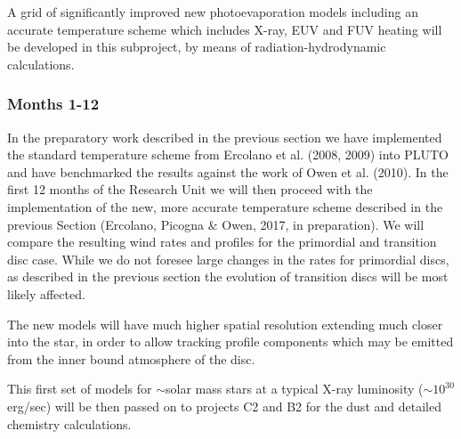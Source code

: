 \documentclass[10pt,fleqn,twoside]{article}
\makeatletter
\renewcommand\paragraph{\@startsection{paragraph}{4}{\z@}%
            {-2.5ex\@plus -1ex \@minus -.25ex}%
            {1.25ex \@plus .25ex}%
            {\normalfont\normalsize\bfseries}}
\makeatother
\begin{document}
A grid of significantly improved new photoevaporation models including
an accurate temperature scheme which includes X-ray, EUV and FUV
heating will be developed in this subproject, by means of
radiation-hydrodynamic calculations. 






\subsubsection{Months 1-12}
In the preparatory work described in the previous section we have
implemented the standard temperature scheme from Ercolano et
al. (2008, 2009) into PLUTO and have benchmarked the results against
the work of Owen et al. (2010). In the first 12 months of the Research
Unit we will then proceed with the implementation of the new, more accurate
temperature scheme described in the previous Section (Ercolano,
Picogna \& Owen, 2017, in preparation). We will compare the resulting
wind rates and profiles for the primordial and transition disc
case. While we do not foresee large changes in the rates for
primordial discs, as described in the previous section the evolution of transition discs will be most
likely affected. 

The new models will have much higher spatial
resolution extending much closer into the star, in order to allow
tracking profile components which may be emitted from the inner bound
atmosphere of the disc. 

This first set of models for $\sim$solar mass stars at a typical X-ray
luminosity ($\sim 10^{30}$erg/sec) will be then passed on to projects
C2 and B2 for the dust and detailed chemistry calculations. 
\end{document}
